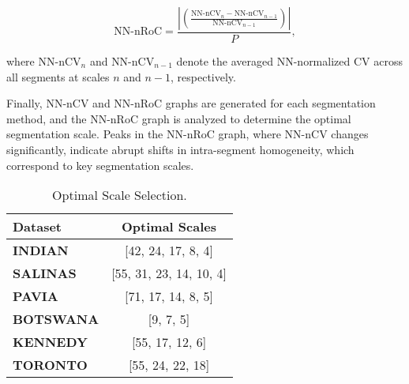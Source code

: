 \[
\text{NN-nRoC} = \frac{\left| \left(\frac{\text{NN-nCV}_{n} - \text{NN-nCV}_{n-1}}{\text{NN-nCV}_{n-1}} \right)\right|}{P},
\]

where \(\text{NN-nCV}_{n}\) and \(\text{NN-nCV}_{n-1}\) denote the averaged NN-normalized CV across all segments at scales \(n\) and \(n-1\), respectively.  

Finally, NN-nCV and NN-nRoC graphs are generated for each segmentation method, and the NN-nRoC graph is analyzed to determine the optimal segmentation scale. Peaks in the NN-nRoC graph, where NN-nCV changes significantly, indicate abrupt shifts in intra-segment homogeneity, which correspond to key segmentation scales.

\begin{table}
\centering
\caption{Optimal Scale Selection.}
\label{tab:optimal_scale_selection}
\begin{tabular}{|l|c|}
\hline
\textbf{Dataset} & \textbf{Optimal Scales} \\
\hline
\textbf{INDIAN}   & [42, 24, 17, 8, 4] \\
\hline 
\textbf{SALINAS}  & [55, 31, 23, 14, 10, 4] \\
\hline 
\textbf{PAVIA}    & [71, 17, 14, 8, 5] \\
\hline 
\textbf{BOTSWANA} & [9, 7, 5] \\
\hline 
\textbf{KENNEDY}  & [55, 17, 12, 6] \\
\hline 
\textbf{TORONTO}  & [55, 24, 22, 18] \\
\hline
\end{tabular}
\end{table}